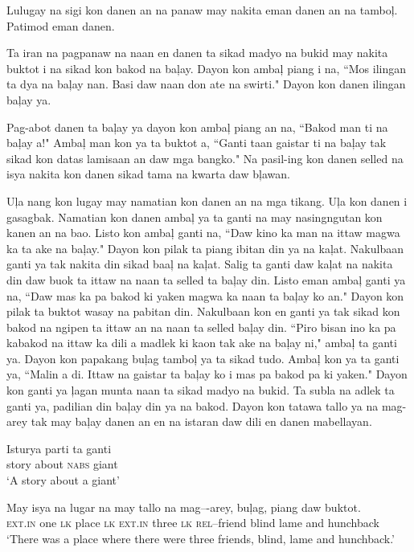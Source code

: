Lulugay na sigi kon danen an na panaw may nakita eman danen an na tambo\c{l}. Patimod eman danen.

Ta iran na pagpanaw na naan en danen ta sikad madyo na bukid may nakita buktot i na sikad kon bakod na ba\c{l}ay. Dayon kon amba\c{l} piang i na, ``Mos ilingan ta dya na ba\c{l}ay nan. Basi daw naan don ate na swirti." Dayon kon danen ilingan ba\c{l}ay ya.

Pag-abot danen ta ba\c{l}ay ya dayon kon amba\c{l} piang an na, ``Bakod man ti na ba\c{l}ay a!" Amba\c{l} man kon ya ta buktot a, ``Ganti taan gaistar ti na ba\c{l}ay tak sikad kon datas lamisaan an daw mga bangko." Na pasil-ing kon danen selled na isya nakita kon danen sikad tama na kwarta daw b\c{l}awan.

U\c{l}a nang kon lugay may namatian kon danen an na mga tikang. U\c{l}a kon danen i gasagbak. Namatian kon danen amba\c{l} ya ta ganti na may nasingngutan kon kanen an na bao. Listo kon amba\c{l} ganti na, ``Daw kino ka man na ittaw magwa ka ta ake na ba\c{l}ay." Dayon kon pilak ta piang ibitan din ya na ka\c{l}at. Nakulbaan ganti ya tak nakita din sikad baa\c{l} na ka\c{l}at. Salig ta ganti daw ka\c{l}at na nakita din daw buok ta ittaw na naan ta selled ta ba\c{l}ay din. Listo eman amba\c{l} ganti ya na, ``Daw mas ka pa bakod ki yaken magwa ka naan ta ba\c{l}ay ko an." Dayon kon pilak ta buktot wasay na pabitan din. Nakulbaan kon en ganti ya tak sikad kon bakod na ngipen ta ittaw an na naan ta selled ba\c{l}ay din. ``Piro bisan ino ka pa kabakod na ittaw ka dili a madlek ki kaon tak ake na ba\c{l}ay ni," amba\c{l} ta ganti ya. Dayon kon papakang bu\c{l}ag tambo\c{l} ya ta sikad tudo. Amba\c{l} kon ya ta ganti ya, ``Malin a di. Ittaw na gaistar ta ba\c{l}ay ko i mas pa bakod pa ki yaken." Dayon kon ganti ya \c{l}agan munta naan ta sikad madyo na bukid. Ta subla na adlek ta ganti ya, padilian din ba\c{l}ay din ya na bakod. Dayon kon tatawa tallo ya na mag-arey tak may ba\c{l}ay danen an en na istaran daw dili en danen mabellayan.

\ea
\gll Isturya parti ta ganti \\
story about \textsc{nabs} giant \\ 
\glt `A story about a giant'
\z

\ea
\gll May  isya  na  lugar  na  may  tallo  na  mag--{}-arey,  bu\c{l}ag,   piang  daw  buktot. \\
\textsc{ext.in}  one  \textsc{lk}  place  \textsc{lk}  \textsc{ext.in}  three  \textsc{lk}  \textsc{rel}--friend  blind lame  and  hunchback \\
\glt ‘There was a place where there were three friends, blind, lame and hunchback.’
\z

